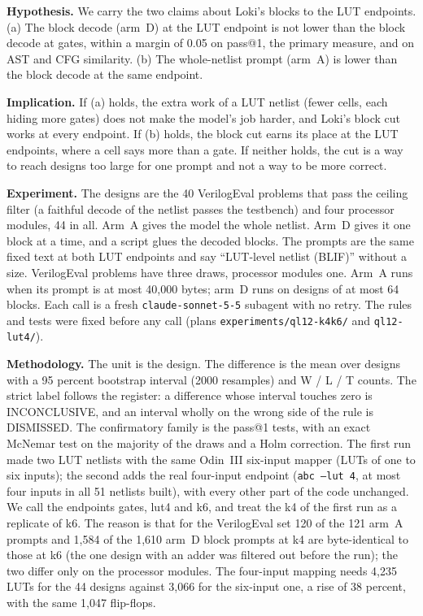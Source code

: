 \documentclass[conference]{IEEEtran}
\newcommand{\hev}[1]{\par\smallskip\noindent\textbf{#1}}
\newcommand{\code}[1]{\texttt{#1}}
\begin{document}
\hev{Hypothesis.} We carry the two claims about Loki's blocks to the LUT endpoints. (a) The block decode (arm~D) at the LUT endpoint is not lower than the block decode at gates, within a margin of 0.05 on pass@1, the primary measure, and on AST and CFG similarity. (b) The whole-netlist prompt (arm~A) is lower than the block decode at the same endpoint.

\hev{Implication.} If (a) holds, the extra work of a LUT netlist (fewer cells, each hiding more gates) does not make the model's job harder, and Loki's block cut works at every endpoint. If (b) holds, the block cut earns its place at the LUT endpoints, where a cell says more than a gate. If neither holds, the cut is a way to reach designs too large for one prompt and not a way to be more correct.

\hev{Experiment.} The designs are the 40 VerilogEval problems that pass the ceiling filter (a faithful decode of the netlist passes the testbench) and four processor modules, 44 in all. Arm~A gives the model the whole netlist. Arm~D gives it one block at a time, and a script glues the decoded blocks. The prompts are the same fixed text at both LUT endpoints and say ``LUT-level netlist (BLIF)'' without a size. VerilogEval problems have three draws, processor modules one. Arm~A runs when its prompt is at most 40,000 bytes; arm~D runs on designs of at most 64 blocks. Each call is a fresh \code{claude-sonnet-5-5} subagent with no retry. The rules and tests were fixed before any call (plans \code{experiments/}\allowbreak\code{ql12-k4k6/} and \code{ql12-lut4/}).

\hev{Methodology.} The unit is the design. The difference is the mean over designs with a 95 percent bootstrap interval (2000 resamples) and W / L / T counts. The strict label follows the register: a difference whose interval touches zero is INCONCLUSIVE, and an interval wholly on the wrong side of the rule is DISMISSED. The confirmatory family is the pass@1 tests, with an exact McNemar test on the majority of the draws and a Holm correction. The first run made two LUT netlists with the same Odin~III six-input mapper (LUTs of one to six inputs); the second adds the real four-input endpoint (\code{abc --lut 4}, at most four inputs in all 51 netlists built), with every other part of the code unchanged. We call the endpoints gates, lut4 and k6, and treat the k4 of the first run as a replicate of k6. The reason is that for the VerilogEval set 120 of the 121 arm~A prompts and 1,584 of the 1,610 arm~D block prompts at k4 are byte-identical to those at k6 (the one design with an adder was filtered out before the run); the two differ only on the processor modules. The four-input mapping needs 4,235 LUTs for the 44 designs against 3,066 for the six-input one, a rise of 38 percent, with the same 1,047 flip-flops.
\end{document}
